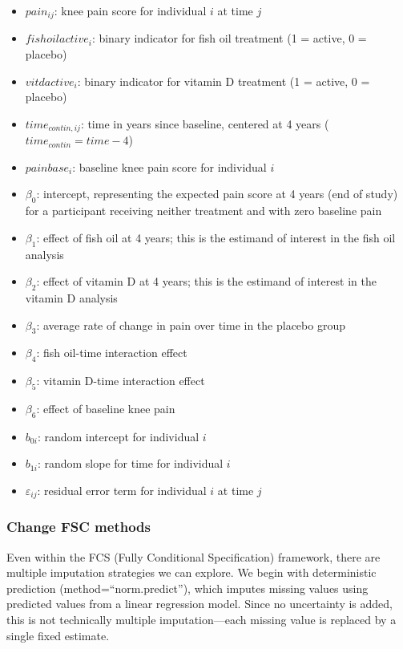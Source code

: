 \documentclass{article}
\providecommand{\tightlist}{%
  \setlength{\itemsep}{0pt}\setlength{\parskip}{0pt}}
\begin{document}
\begin{itemize}
\tightlist
\item
  \(pain_{ij}\): knee pain score for individual \(i\) at time \(j\)
\item
  \(fishoilactive_i\): binary indicator for fish oil treatment (1 =
  active, 0 = placebo)
\item
  \(vitdactive_i\): binary indicator for vitamin D treatment (1 =
  active, 0 = placebo)
\item
  \(time_{contin,ij}\): time in years since baseline, centered at 4
  years (\(time_{contin} = time - 4\))
\item
  \(painbase_i\): baseline knee pain score for individual \(i\)
\item
  \(\beta_0\): intercept, representing the expected pain score at 4
  years (end of study) for a participant receiving neither treatment and
  with zero baseline pain
\item
  \(\beta_1\): effect of fish oil at 4 years; this is the estimand of
  interest in the fish oil analysis
\item
  \(\beta_2\): effect of vitamin D at 4 years; this is the estimand of
  interest in the vitamin D analysis
\item
  \(\beta_3\): average rate of change in pain over time in the placebo
  group
\item
  \(\beta_4\): fish oil-time interaction effect
\item
  \(\beta_5\): vitamin D-time interaction effect
\item
  \(\beta_6\): effect of baseline knee pain
\item
  \(b_{0i}\): random intercept for individual \(i\)
\item
  \(b_{1i}\): random slope for time for individual \(i\)
\item
  \(\varepsilon_{ij}\): residual error term for individual \(i\) at time
  \(j\)
\end{itemize}

\subsubsection{Change FSC methods}\label{change-fsc-methods}

Even within the FCS (Fully Conditional Specification) framework, there
are multiple imputation strategies we can explore. We begin with
deterministic prediction (method=``norm.predict''), which imputes
missing values using predicted values from a linear regression model.
Since no uncertainty is added, this is not technically multiple
imputation---each missing value is replaced by a single fixed estimate.
\end{document}
